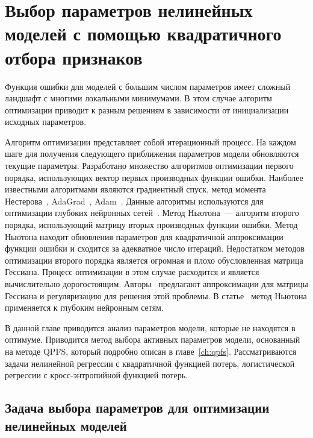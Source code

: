 \chapter{Выбор параметров нелинейных моделей с помощью квадратичного отбора признаков}
\label{ch:newton_qpfs}

Функция ошибки для моделей с большим числом параметров имеет сложный ландшафт с многими локальными минимумами.
В этом случае алгоритм оптимизации приводит к разным решениям в зависимости от инициализации исходных параметров.

Алгоритм оптимизации представляет собой итерационный процесс.
На каждом шаге для получения следующего приближения параметров модели обновляются текущие параметры.
Разработано множество алгоритмов оптимизации первого порядка, использующих вектор первых производных функции ошибки.
Наиболее известными алгоритмами являются градиентный спуск, 
метод момента Нестерова~\cite{nesterov1983momentum}, AdaGrad~\cite{duchi2011adagrad}, Adam~\cite{kingma2014adam}.
Данные алгоритмы используются для оптимизации глубоких нейронных сетей~\cite{goodfellow2016deeplearningbook}.
Метод Ньютона~--- алгоритм второго порядка, использующий матрицу вторых производных функции ошибки.
Метод Ньютона находит обновления параметров для квадратичной аппроксимации функции ошибки и сходится за адекватное число итераций.
Недостатком методов оптимизации второго порядка является огромная и плохо обусловленная матрица Гессиана.
Процесс оптимизации в этом случае расходится и является вычислительно дорогостоящим.
Авторы~\cite{avriel2003nonlinear,blaschke1997convergence} предлагают аппроксимации для матрицы Гессиана и регуляризацию для решения этой проблемы.
В статье~\cite{botev2017newtondeeplearning} метод Ньютона применяется к глубоким нейронным сетям.

В данной главе приводится анализ параметров модели, которые не находятся в оптимуме.
Приводится метод выбора активных параметров модели, основанный на методе QPFS, который подробно описан в главе~\ref{ch:qpfs}.
Рассматриваются задачи нелинейной регрессии с квадратичной функцией потерь, логистической регрессии с кросс-энтропийной функцией потерь.  

\section{Задача выбора параметров для оптимизации нелинейных моделей}
\label{sec:ch4:newton_qpfs_param_selection}

